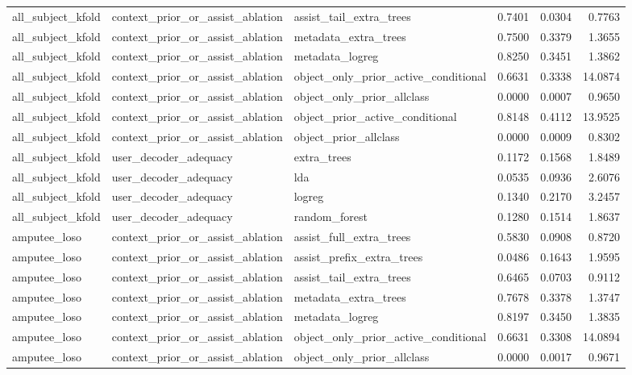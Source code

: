 \begin{table}[!t]
\begin{tabular}{lllrrr}
all\_subject\_kfold & context\_prior\_or\_assist\_ablation & assist\_tail\_extra\_trees & 0.7401 & 0.0304 & 0.7763 \\
all\_subject\_kfold & context\_prior\_or\_assist\_ablation & metadata\_extra\_trees & 0.7500 & 0.3379 & 1.3655 \\
all\_subject\_kfold & context\_prior\_or\_assist\_ablation & metadata\_logreg & 0.8250 & 0.3451 & 1.3862 \\
all\_subject\_kfold & context\_prior\_or\_assist\_ablation & object\_only\_prior\_active\_conditional & 0.6631 & 0.3338 & 14.0874 \\
all\_subject\_kfold & context\_prior\_or\_assist\_ablation & object\_only\_prior\_allclass & 0.0000 & 0.0007 & 0.9650 \\
all\_subject\_kfold & context\_prior\_or\_assist\_ablation & object\_prior\_active\_conditional & 0.8148 & 0.4112 & 13.9525 \\
all\_subject\_kfold & context\_prior\_or\_assist\_ablation & object\_prior\_allclass & 0.0000 & 0.0009 & 0.8302 \\
all\_subject\_kfold & user\_decoder\_adequacy & extra\_trees & 0.1172 & 0.1568 & 1.8489 \\
all\_subject\_kfold & user\_decoder\_adequacy & lda & 0.0535 & 0.0936 & 2.6076 \\
all\_subject\_kfold & user\_decoder\_adequacy & logreg & 0.1340 & 0.2170 & 3.2457 \\
all\_subject\_kfold & user\_decoder\_adequacy & random\_forest & 0.1280 & 0.1514 & 1.8637 \\
amputee\_loso & context\_prior\_or\_assist\_ablation & assist\_full\_extra\_trees & 0.5830 & 0.0908 & 0.8720 \\
amputee\_loso & context\_prior\_or\_assist\_ablation & assist\_prefix\_extra\_trees & 0.0486 & 0.1643 & 1.9595 \\
amputee\_loso & context\_prior\_or\_assist\_ablation & assist\_tail\_extra\_trees & 0.6465 & 0.0703 & 0.9112 \\
amputee\_loso & context\_prior\_or\_assist\_ablation & metadata\_extra\_trees & 0.7678 & 0.3378 & 1.3747 \\
amputee\_loso & context\_prior\_or\_assist\_ablation & metadata\_logreg & 0.8197 & 0.3450 & 1.3835 \\
amputee\_loso & context\_prior\_or\_assist\_ablation & object\_only\_prior\_active\_conditional & 0.6631 & 0.3308 & 14.0894 \\
amputee\_loso & context\_prior\_or\_assist\_ablation & object\_only\_prior\_allclass & 0.0000 & 0.0017 & 0.9671 \\

\end{tabular}
\end{table}
